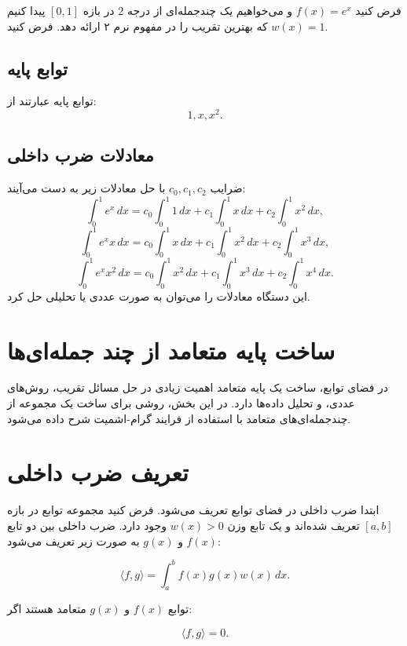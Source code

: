 \begin{example}
	
	فرض کنید \(f(x) = e^x\) و می‌خواهیم یک چندجمله‌ای از درجه \(2\) در بازه \([0, 1]\) پیدا کنیم که بهترین تقریب را در مفهوم نرم ۲ ارائه دهد. فرض کنید \(w(x) = 1\).
\end{example}

\begin{solution}
	\subsection{توابع پایه}
	توابع پایه عبارتند از:
	\[
	1, x, x^2.
	\]
	\subsection{معادلات ضرب داخلی}
	
	ضرایب \(c_0, c_1, c_2\) با حل معادلات زیر به دست می‌آیند:
	\[
	\int_0^1 e^x \, dx = c_0 \int_0^1 1 \, dx + c_1 \int_0^1 x \, dx + c_2 \int_0^1 x^2 \, dx,
	\]
	\[
	\int_0^1 e^x x \, dx = c_0 \int_0^1 x \, dx + c_1 \int_0^1 x^2 \, dx + c_2 \int_0^1 x^3 \, dx,
	\]
	\[
	\int_0^1 e^x x^2 \, dx = c_0 \int_0^1 x^2 \, dx + c_1 \int_0^1 x^3 \, dx + c_2 \int_0^1 x^4 \, dx.
	\]
	این دستگاه معادلات را می‌توان به صورت عددی یا تحلیلی حل کرد.
\end{solution}

\section{ساخت پایه متعامد از چند جمله‌ای‌ها}

در فضای توابع، ساخت یک پایه متعامد اهمیت زیادی در حل مسائل تقریب، روش‌های عددی، و تحلیل داده‌ها دارد. در این بخش، روشی برای ساخت یک مجموعه از چندجمله‌ای‌های متعامد با استفاده از فرایند گرام-اشمیت شرح داده می‌شود.

\section{تعریف ضرب داخلی}

ابتدا ضرب داخلی در فضای توابع تعریف می‌شود. فرض کنید مجموعه توابع در بازه \([a, b]\) تعریف شده‌اند و یک تابع وزن \(w(x) > 0\) وجود دارد. ضرب داخلی بین دو تابع \(f(x)\) و \(g(x)\) به صورت زیر تعریف می‌شود:

\[
\langle f, g \rangle = \int_a^b f(x) g(x) w(x) \, dx.
\]

توابع \(f(x)\) و \(g(x)\) متعامد هستند اگر:

\[
\langle f, g \rangle = 0.
\]

